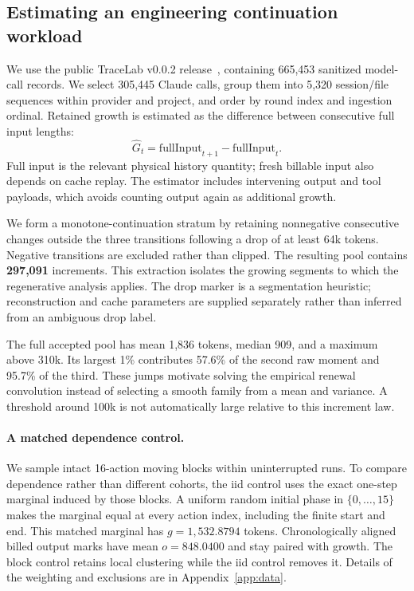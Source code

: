 \documentclass[sigconf,screen,nonacm]{acmart}
\begin{document}
\subsection{Estimating an engineering continuation workload}
\label{sec:estimation}

We use the public TraceLab v0.0.2 release~\cite{tracelab}, containing 665,453
sanitized model-call records. We select 305,445 Claude calls, group them into
5,320 session/file sequences within provider and project, and order by round
index and ingestion ordinal. Retained growth is estimated as the difference
between consecutive full input lengths:
\begin{equation}
\widehat G_t=\mathrm{fullInput}_{t+1}-\mathrm{fullInput}_t.
\label{eq:growthproxy}
\end{equation}
Full input is the relevant physical history quantity; fresh billable input
also depends on cache replay. The estimator includes intervening output and
tool payloads, which avoids counting output again as additional growth.

We form a monotone-continuation stratum by retaining nonnegative consecutive
changes outside the three transitions following a drop of at least 64k
tokens. Negative transitions are excluded rather than clipped. The resulting
pool contains \textbf{297,091} increments. This extraction isolates the growing
segments to which the regenerative analysis applies. The drop marker is a
segmentation heuristic; reconstruction and cache parameters are supplied
separately rather than inferred from an ambiguous drop label.

The full accepted pool has mean 1,836 tokens, median 909, and a maximum above
310k. Its largest 1\% contributes 57.6\% of the second raw moment and 95.7\%
of the third. These jumps motivate solving the empirical renewal convolution
instead of selecting a smooth family from a mean and variance. A threshold
around 100k is not automatically large relative to this increment law.

\paragraph{A matched dependence control.}
We sample intact 16-action moving blocks within uninterrupted runs. To compare
dependence rather than different cohorts, the iid control uses the exact
one-step marginal induced by those blocks. A uniform random initial phase
in $\{0,\ldots,15\}$ makes the marginal equal at every action index, including
the finite start and end. This matched marginal has $g=1,532.8794$ tokens.
Chronologically aligned billed output marks have mean $o=848.0400$ and stay
paired with growth. The block control retains local clustering while the iid
control removes it. Details of the weighting and exclusions are in
Appendix~\ref{app:data}.
\end{document}
